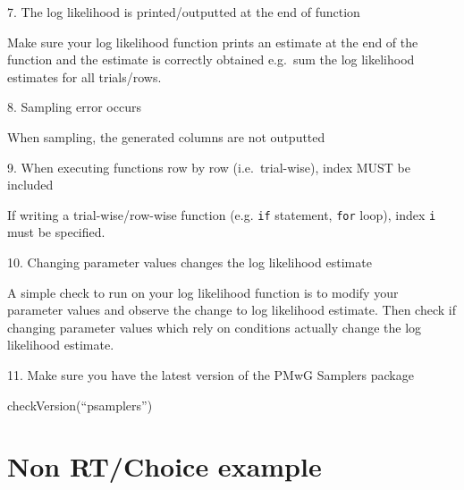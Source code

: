 \documentclass[]{book}
\newenvironment{Shaded}{\begin{snugshade}}{\end{snugshade}}
\newcommand{\CommentTok}[1]{\textcolor[rgb]{0.56,0.35,0.01}{\textit{#1}}}
\newcommand{\ControlFlowTok}[1]{\textcolor[rgb]{0.13,0.29,0.53}{\textbf{#1}}}
\newcommand{\NormalTok}[1]{#1}
\newcommand{\OperatorTok}[1]{\textcolor[rgb]{0.81,0.36,0.00}{\textbf{#1}}}
\newcommand{\StringTok}[1]{\textcolor[rgb]{0.31,0.60,0.02}{#1}}
\begin{document}
7. The log likelihood is printed/outputted at the end of function

Make sure your log likelihood function prints an estimate at the end of the function and the estimate is correctly obtained e.g.~sum the log likelihood estimates for all trials/rows.

8. Sampling error occurs

When sampling, the generated columns are not outputted

9. When executing functions row by row (i.e.~trial-wise), index MUST be included

If writing a trial-wise/row-wise function (e.g. \texttt{if} statement, \texttt{for} loop), index \texttt{i} must be specified.

\begin{Shaded}
\end{Shaded}

10. Changing parameter values changes the log likelihood estimate

A simple check to run on your log likelihood function is to modify your parameter values and observe the change to log likelihood estimate. Then check if changing parameter values which rely on conditions actually change the log likelihood estimate.

11. Make sure you have the latest version of the PMwG Samplers package

checkVersion(``psamplers'')

\hypertarget{non-rtchoice-example}{%
\chapter{Non RT/Choice example}\label{non-rtchoice-example}}


\end{document}
